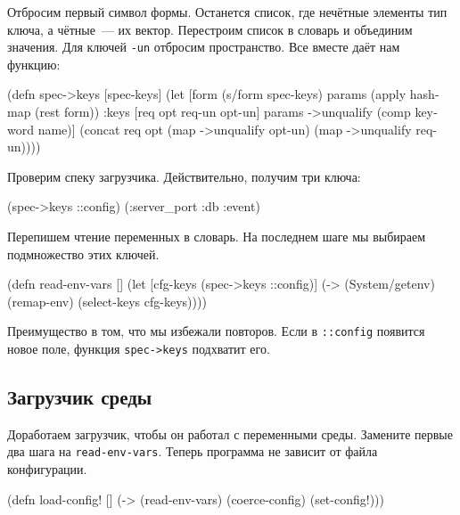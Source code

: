 Отбросим первый символ формы. Останется список, где нечётные элементы тип ключа,
а чётные~--- их вектор. Перестроим список в словарь и объединим значения. Для
ключей \verb|-un| отбросим пространство. Все вместе даёт нам функцию:


\begin{english}
  \begin{clojure}
(defn spec->keys
  [spec-keys]
  (let [form (s/form spec-keys)
        params (apply hash-map (rest form))
        {:keys [req opt req-un opt-un]} params
        ->unqualify (comp keyword name)]
    (concat req
            opt
            (map ->unqualify opt-un)
            (map ->unqualify req-un))))
  \end{clojure}
\end{english}

\noindent
Проверим спеку загрузчика. Действительно, получим три ключа:

\begin{english}
  \begin{clojure}
(spec->keys ::config)
(:server_port :db :event)
  \end{clojure}
\end{english}

\noindent
Перепишем чтение переменных в словарь. На последнем шаге мы выбираем
подмножество этих ключей.

\begin{english}
  \begin{clojure}
(defn read-env-vars []
  (let [cfg-keys (spec->keys ::config)]
    (-> (System/getenv)
        (remap-env)
        (select-keys cfg-keys))))
  \end{clojure}
\end{english}

\noindent
Преимущество в том, что мы избежали повторов. Если в \verb|::config| появится
новое поле, функция \verb|spec->keys| подхватит его.

\subsection{Загрузчик среды}

Доработаем загрузчик, чтобы он работал с переменными среды. Замените первые два
шага на \verb|read-env-vars|. Теперь программа не зависит от файла
конфигурации.

\begin{english}
  \begin{clojure}
(defn load-config! []
  (-> (read-env-vars)
      (coerce-config)
      (set-config!)))
  \end{clojure}
\end{english}

